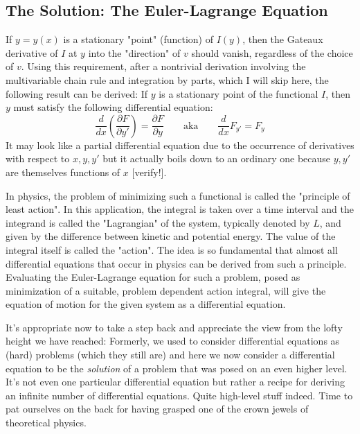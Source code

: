 \subsection{The Solution: The Euler-Lagrange Equation}
If $y = y(x)$ is a stationary "point" (function) of $I(y)$, then the Gateaux derivative of $I$ at $y$ into the "direction" of $v$ should vanish, regardless of the choice of $v$. Using this requirement, after a nontrivial derivation involving the multivariable chain rule and integration by parts, which I will skip here, the following result can be derived: If $y$ is a stationary point of the functional $I$, then $y$ must satisfy the following differential equation:
\begin{equation}
 \frac{d}{d x} \left(  \frac{\partial F}{\partial y'}  \right) = \frac{\partial F}{\partial y}
 \qquad \text{aka} \qquad
 \frac{d}{d x} F_{y'} = F_{y}
\end{equation}
It may look like a partial differential equation due to the occurrence of derivatives with respect to $x,y,y'$ but it actually boils down to an ordinary one because $y,y'$ are themselves functions of $x$ [verify!].

\medskip
In physics, the problem of minimizing such a functional is called the "principle of least action". In this application, the integral is taken over a time interval and the integrand is called the "Lagrangian" of the system, typically denoted by $L$, and given by the difference between kinetic and potential energy. The value of the integral itself is called the "action". The idea is so fundamental that almost all differential equations that occur in physics can be derived from such a principle. Evaluating the Euler-Lagrange equation for such a problem, posed as minimization of a suitable, problem dependent action integral, will give the equation of motion for the given system as a differential equation.

\medskip
It's appropriate now to take a step back and appreciate the view from the lofty height we have reached:  Formerly, we used to consider differential equations as (hard) problems (which they still are) and here we now consider a differential equation to be the \emph{solution} of a problem that was posed on an even higher level. It's not even one particular differential equation but rather a recipe for deriving an infinite number of differential equations. Quite high-level stuff indeed. Time to pat ourselves on the back for having grasped one of the crown jewels of theoretical physics. 


